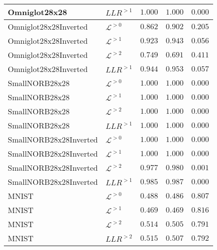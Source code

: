 {\begin{table}[t]
\begin{tabular}{llrrr}
Omniglot28x28                  &  $LLR^{>1}$  &  $1.000$  &  $1.000$  &  $0.000$ \\
\midrule
Omniglot28x28Inverted            &  $\mathcal{L}^{>0}$  &  $0.862$  &  $0.902$  &  $0.205$ \\
Omniglot28x28Inverted            &  $\mathcal{L}^{>1}$  &  $0.923$  &  $0.943$  &  $0.056$ \\
Omniglot28x28Inverted            &  $\mathcal{L}^{>2}$  &  $0.749$  &  $0.691$  &  $0.411$ \\
Omniglot28x28Inverted          &  $LLR^{>1}$  &  $0.944$  &  $0.953$  &  $0.057$ \\
\midrule
SmallNORB28x28                   &  $\mathcal{L}^{>0}$  &  $1.000$  &  $1.000$  &  $0.000$ \\
SmallNORB28x28                   &  $\mathcal{L}^{>1}$  &  $1.000$  &  $1.000$  &  $0.000$ \\
SmallNORB28x28                   &  $\mathcal{L}^{>2}$  &  $1.000$  &  $1.000$  &  $0.000$ \\
SmallNORB28x28                 &  $LLR^{>1}$  &  $1.000$  &  $1.000$  &  $0.000$ \\
\midrule
SmallNORB28x28Inverted           &  $\mathcal{L}^{>0}$  &  $1.000$  &  $1.000$  &  $0.000$ \\
SmallNORB28x28Inverted           &  $\mathcal{L}^{>1}$  &  $1.000$  &  $1.000$  &  $0.000$ \\
SmallNORB28x28Inverted           &  $\mathcal{L}^{>2}$  &  $0.977$  &  $0.980$  &  $0.001$ \\
SmallNORB28x28Inverted         &  $LLR^{>1}$  &  $0.985$  &  $0.987$  &  $0.000$ \\
\midrule
MNIST                            &  $\mathcal{L}^{>0}$  &  $0.488$  &  $0.486$  &  $0.807$ \\
MNIST                            &  $\mathcal{L}^{>1}$  &  $0.469$  &  $0.469$  &  $0.816$ \\
MNIST                            &  $\mathcal{L}^{>2}$  &  $0.514$  &  $0.505$  &  $0.791$ \\
MNIST                          &  $LLR^{>2}$  &  $0.515$  &  $0.507$  &  $0.792$ \\
         \bottomrule
    \end{tabular}
    \label{tab_hierarchical:additional-results-mnist}
\end{table}
}

